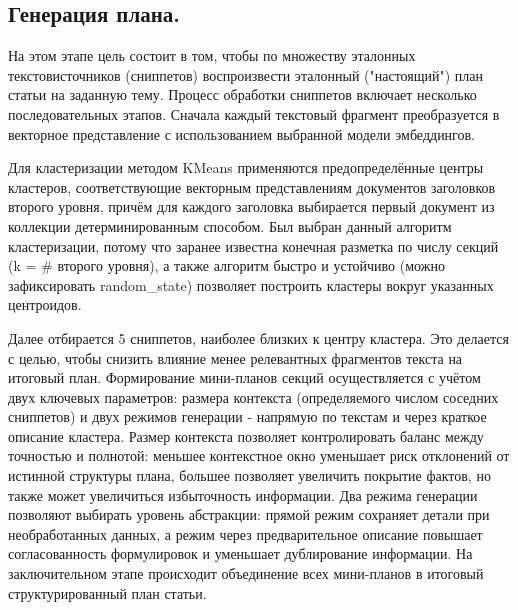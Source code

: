 \documentclass{article}
\theoremstyle{definition}
\theoremstyle{plain}
\begin{document}
\subsection*{Генерация плана.}

На этом этапе цель состоит в том, чтобы по множеству эталонных текстов\-источников (сниппетов) воспроизвести эталонный ("настоящий") план статьи на заданную тему.
Процесс обработки сниппетов включает несколько последовательных этапов. 
Сначала каждый текстовый фрагмент преобразуется в векторное представление с использованием выбранной модели эмбеддингов. 

Для кластеризации методом KMeans применяются предопределённые центры кластеров, 
соответствующие векторным представлениям документов заголовков второго уровня, причём для каждого заголовка выбирается первый документ из коллекции детерминированным способом. 
Был выбран данный алгоритм кластеризации, потому что заранее известна конечная разметка по числу секций (k = \# второго уровня), а также алгоритм быстро и устойчиво (можно зафиксировать random\_state) 
позволяет построить кластеры вокруг указанных центроидов.

Далее отбирается 5 сниппетов, наиболее близких к центру кластера. Это делается с целью, чтобы снизить влияние менее релевантных фрагментов текста на итоговый план. 
Формирование мини-планов секций осуществляется с учётом двух ключевых параметров: 
размера контекста (определяемого числом соседних сниппетов) и двух режимов генерации - напрямую по текстам и через краткое описание кластера.
Размер контекста позволяет контролировать баланс между точностью и полнотой: 
меньшее контекстное окно уменьшает риск отклонений от истинной структуры плана, большее позволяет увеличить покрытие фактов, но также может увеличиться избыточность информации.
Два режима генерации позволяют выбирать уровень абстракции: 
прямой режим сохраняет детали при необработанных данных, а режим через предварительное описание
повышает согласованность формулировок и уменьшает дублирование информации.
На заключительном этапе происходит объединение всех мини-планов в итоговый структурированный план статьи.
\end{document}
